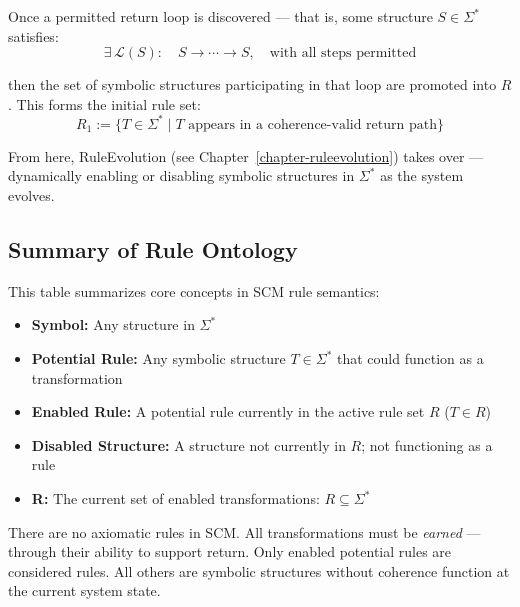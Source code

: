 \begin{definition} \label{def:rule-emergence}
Once a permitted return loop is discovered — that is, some structure $S \in \Sigma^*$ satisfies:
\begin{equation} \label{eq:return-loop-condition}
\exists\, \mathcal{L}(S):\quad S \rightarrow \cdots \rightarrow S, \quad \text{with all steps permitted}
\end{equation}

then the set of symbolic structures participating in that loop are promoted into $R$.  
This forms the initial rule set:
\begin{equation} \label{eq:r1-definition}
R_1 := \{ T \in \Sigma^* \mid T \text{ appears in a coherence-valid return path} \}
\end{equation}

From here, RuleEvolution (see Chapter~\ref{chapter-ruleevolution}) takes over — dynamically enabling or disabling symbolic structures in $\Sigma^*$ as the system evolves.
\end{definition}

\subsection{Summary of Rule Ontology} \label{summary-of-rule-ontology}

This table summarizes core concepts in SCM rule semantics:

\begin{itemize}
  \item \textbf{Symbol:} Any structure in $\Sigma^*$
  \item \textbf{Potential Rule:} Any symbolic structure $T \in \Sigma^*$ that could function as a transformation
  \item \textbf{Enabled Rule:} A potential rule currently in the active rule set $R$ ($T \in R$)
  \item \textbf{Disabled Structure:} A structure not currently in $R$; not functioning as a rule
  \item \textbf{R:} The current set of enabled transformations: $R \subseteq \Sigma^*$
\end{itemize}

There are no axiomatic rules in SCM. All transformations must be \textit{earned} — through their ability to support return.  
Only enabled potential rules are considered rules. All others are symbolic structures without coherence function at the current system state.

